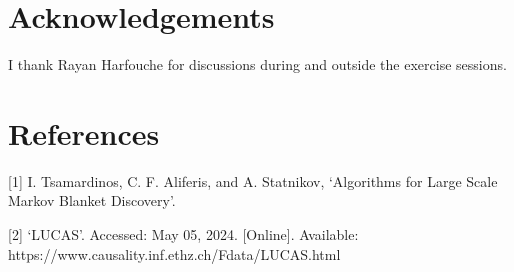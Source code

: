 \documentclass[a4paper, 12pt,oneside]{article}
\begin{document}
    \section*{Acknowledgements}
    I thank Rayan Harfouche for discussions during and outside the exercise sessions.
    \section*{References}
    [1] I. Tsamardinos, C. F. Aliferis, and A. Statnikov, ‘Algorithms for Large Scale Markov Blanket Discovery’.

    [2] ‘LUCAS’. Accessed: May 05, 2024. [Online]. \newline Available: https://www.causality.inf.ethz.ch/Fdata/LUCAS.html
\end{document}
